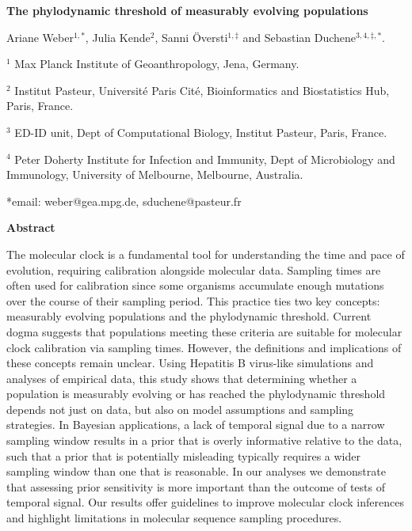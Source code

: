 \documentclass[11pt]{article}
\begin{document}
\begin{flushright}

\end{flushright}
\begin{center}
	\begin{LARGE}
	\textbf{The phylodynamic threshold of measurably evolving populations}
	\end{LARGE}

Ariane Weber$^{1,*}$, Julia Kende$^{2}$, Sanni Översti$^{1, \ddagger}$ and Sebastian Duchene$^{3,4,\ddagger, *}$.
\end{center}

$^{1}$ Max Planck Institute of Geoanthropology, Jena, Germany.

$^{2}$ Institut Pasteur, Université Paris Cité, Bioinformatics and Biostatistics Hub, Paris, France.

$^{3}$ ED-ID unit, Dept of Computational Biology, Institut Pasteur, Paris, France.

$^{4}$ Peter Doherty Institute for Infection and Immunity, Dept of Microbiology and Immunology, University of Melbourne, Melbourne, Australia.


*email: weber@gea.mpg.de, sduchene@pasteur.fr
\newline

\begin{Large}
	\textbf{Abstract}
\end{Large}
The molecular clock is a fundamental tool for understanding the time and pace of evolution, requiring calibration alongside molecular data. Sampling times are often used for calibration since some organisms accumulate enough mutations over the course of their sampling period. This practice ties two key concepts: measurably evolving populations and the phylodynamic threshold. Current dogma suggests that populations meeting these criteria are suitable for molecular clock calibration via sampling times. However, the definitions and implications of these concepts remain unclear. Using Hepatitis B virus-like simulations and analyses of empirical data, this study shows that determining whether a population is measurably evolving or has reached the phylodynamic threshold depends not just on data, but also on model assumptions and sampling strategies. In Bayesian applications, a lack of temporal signal due to a narrow sampling window results in a prior that is overly informative relative to the data, such that a prior that is potentially misleading typically requires a wider sampling window than one that is reasonable. In our analyses we demonstrate that assessing prior sensitivity is more important than the outcome of tests of temporal signal. Our results offer guidelines to improve molecular clock inferences and highlight limitations in molecular sequence sampling procedures.
\end{document}
